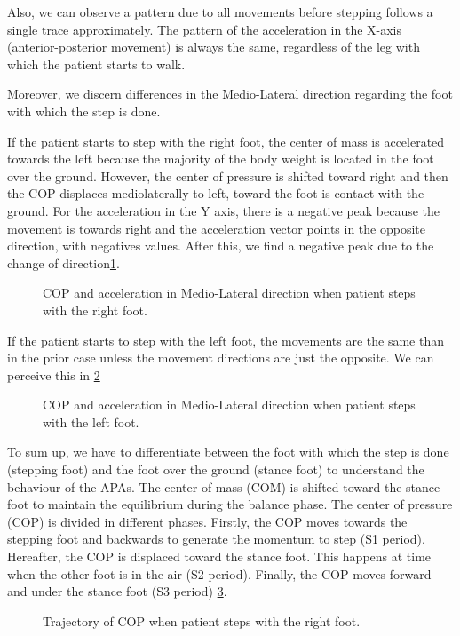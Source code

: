 Also, we can observe a pattern due to all movements before stepping follows a single trace approximately. The pattern of the acceleration in the X-axis (anterior-posterior movement) is always the same, regardless of the leg with which the patient starts to walk.

Moreover, we discern differences in the Medio-Lateral direction regarding the foot with which the step is done. 

If the patient starts to step with the right foot, the center of mass is accelerated towards the left because the majority of the body weight is located in the foot over the ground. However, the center of pressure is shifted toward right and then the COP displaces mediolaterally to left, toward the foot is contact with the ground. For the acceleration in the Y axis, there is a negative peak because the movement is towards right and the acceleration vector points in the opposite direction, with negatives values. After this, we find a negative peak due to the change of direction\ref{fig:ML_AccY_right}. 

\begin{figure}[H]
	\centering
	\caption{COP and acceleration in Medio-Lateral direction when patient steps with the right foot.}
	\label{fig:ML_AccY_right}
\end{figure}

If the patient starts to step with the left foot, the movements are the same than in the prior case unless the movement directions are just the opposite. We can perceive this in \ref{fig:ML_AccY_left}

\begin{figure}[H]
	\centering
	\caption{COP and acceleration in Medio-Lateral direction when patient steps with the left foot.}
	\label{fig:ML_AccY_left}
\end{figure}
To sum up, we have to differentiate between the foot with which the step is done (stepping foot) and the foot over the ground (stance foot) to understand the behaviour of the APAs. The center of mass (COM) is shifted toward the stance foot to maintain the equilibrium during the balance phase. The center of pressure (COP) is divided in different phases. Firstly, the COP moves towards the stepping foot and backwards to generate the momentum to step (S1 period). Hereafter, the COP is displaced toward the stance foot. This happens at time when the other foot is in the air (S2 period). Finally, the COP moves forward and under the stance foot (S3 period) \ref{fig:trajectoryCOP}.
\begin{figure}[H]
	\centering
	\caption{Trajectory of COP when patient steps with the right foot.}
	\label{fig:trajectoryCOP}
\end{figure}


